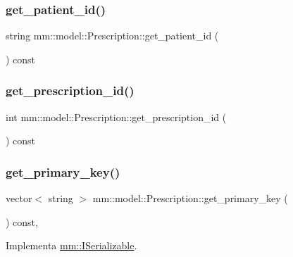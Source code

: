 \subsubsection{\texorpdfstring{get\+\_\+patient\+\_\+id()}{get\_patient\_id()}}
{\footnotesize\ttfamily string mm\+::model\+::\+Prescription\+::get\+\_\+patient\+\_\+id (\begin{DoxyParamCaption}{ }\end{DoxyParamCaption}) const}

\mbox{\label{classmm_1_1model_1_1_prescription_a6179b066586ebb5a1dc0d8f6a6c11a45}} 
\subsubsection{\texorpdfstring{get\+\_\+prescription\+\_\+id()}{get\_prescription\_id()}}
{\footnotesize\ttfamily int mm\+::model\+::\+Prescription\+::get\+\_\+prescription\+\_\+id (\begin{DoxyParamCaption}{ }\end{DoxyParamCaption}) const}

\mbox{\label{classmm_1_1model_1_1_prescription_af521915f8872df18ae4a50ff2a4f59ff}} 
\subsubsection{\texorpdfstring{get\+\_\+primary\+\_\+key()}{get\_primary\_key()}}
{\footnotesize\ttfamily vector$<$ string $>$ mm\+::model\+::\+Prescription\+::get\+\_\+primary\+\_\+key (\begin{DoxyParamCaption}{ }\end{DoxyParamCaption}) const\hspace{0.3cm}{\ttfamily [override]}, {\ttfamily [virtual]}}



Implementa \mbox{\hyperlink{classmm_1_1_i_serializable_a69c0c514e11e386b6cb1fbd03f14da17}{mm\+::\+I\+Serializable}}.

